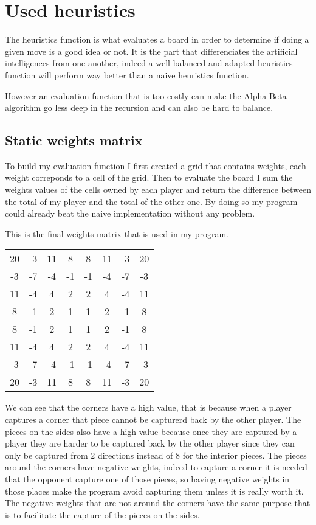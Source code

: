 \section{Used heuristics}

The heuristics function is what evaluates a board in order to determine if doing a given move is a good idea or not.
It is the part that differenciates the artificial intelligences from one another, indeed a well balanced and adapted heuristics function will perform way better than a naive heuristics function.

However an evaluation function that is too costly can make the Alpha Beta algorithm go less deep in the recursion and can also be hard to balance.

\subsection{Static weights matrix}

To build my evaluation function I first created a grid that contains weights, each weight correponds to a cell of the grid.
Then to evaluate the board I sum the weights values of the cells owned by each player and return the difference between the total of my player and the total of the other one.
By doing so my program could already beat the naive implementation without any problem.

This is the final weights matrix that is used in my program.

\begin{center}
    \begin{tabular}{ c c c c c c c c } 
        20 & -3 & 11 & 8 & 8 & 11 & -3 & 20\\ 
        -3 & -7 & -4 & -1 & -1 & -4 & -7 & -3\\ 
        11 & -4 & 4 & 2 & 2 & 4 & -4 & 11\\ 
        8 & -1 & 2 & 1 & 1 & 2 & -1 & 8\\ 
        8 & -1 & 2 & 1 & 1 & 2 & -1 & 8\\ 
        11 & -4 & 4 & 2 & 2 & 4 & -4 & 11\\ 
        -3 & -7 & -4 & -1 & -1 & -4 & -7 & -3\\ 
        20 & -3 & 11 & 8 & 8 & 11 & -3 & 20\\ 
    \end{tabular}
\end{center}

We can see that the corners have a high value, that is because when a player captures a corner that piece cannot be capturerd back by the other player.
The pieces on the sides also have a high value because once they are captured by a player they are harder to be captured back by the other player since they can only be captured from 2 directions instead of 8 for the interior pieces.
The pieces around the corners have negative weights, indeed to capture a corner it is needed that the opponent capture one of those pieces, so having negative weights in those places make the program avoid capturing them unless it is really worth it.
The negative weights that are not around the corners have the same purpose that is to facilitate the capture of the pieces on the sides.

